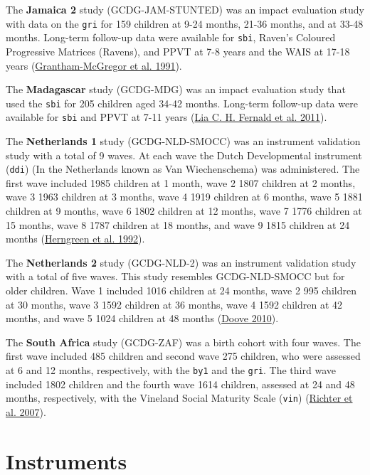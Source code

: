\documentclass[
]{book}
\begin{document}
The \textbf{Jamaica 2} study (GCDG-JAM-STUNTED) was an impact evaluation study with data on the \texttt{gri} for 159 children at 9-24 months, 21-36 months, and at 33-48 months. Long-term follow-up data were available for \texttt{sbi}, Raven's Coloured Progressive Matrices (Ravens), and PPVT at 7-8 years and the WAIS at 17-18 years (\protect\hyperlink{ref-Grantham-McGregor1991}{Grantham-McGregor et al. 1991}).

The \textbf{Madagascar} study (GCDG-MDG) was an impact evaluation study that used the \texttt{sbi} for 205 children aged 34-42 months. Long-term follow-up data were available for \texttt{sbi} and PPVT at 7-11 years (\protect\hyperlink{ref-Fernald2011}{Lia C. H. Fernald et al. 2011}).

The \textbf{Netherlands 1} study (GCDG-NLD-SMOCC) was an instrument validation study with a total of 9 waves. At each wave the Dutch Developmental instrument (\texttt{ddi}) (In the Netherlands known as Van Wiechenschema) was administered. The first wave included 1985 children at 1 month, wave 2 1807 children at 2 months, wave 3 1963 children at 3 months, wave 4 1919 children at 6 months, wave 5 1881 children at 9 months, wave 6 1802 children at 12 months, wave 7 1776 children at 15 months, wave 8 1787 children at 18 months, and wave 9 1815 children at 24 months (\protect\hyperlink{ref-herngreen1992}{Herngreen et al. 1992}).

The \textbf{Netherlands 2} study (GCDG-NLD-2) was an instrument validation study with a total of five waves. This study resembles GCDG-NLD-SMOCC but for older children. Wave 1 included 1016 children at 24 months, wave 2 995 children at 30 months, wave 3 1592 children at 36 months, wave 4 1592 children at 42 months, and wave 5 1024 children at 48 months (\protect\hyperlink{ref-doove2010}{Doove 2010}).

The \textbf{South Africa} study (GCDG-ZAF) was a birth cohort with four waves. The first wave included 485 children and second wave 275 children, who were assessed at 6 and 12 months, respectively, with the \texttt{by1} and the \texttt{gri}. The third wave included 1802 children and the fourth wave 1614 children, assessed at 24 and 48 months, respectively, with the Vineland Social Maturity Scale (\texttt{vin}) (\protect\hyperlink{ref-Richter2007}{Richter et al. 2007}).

\hypertarget{sec:instruments}{%
\section{Instruments}\label{sec:instruments}}
\end{document}
